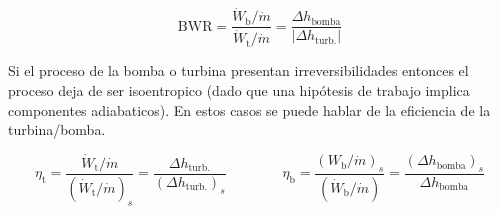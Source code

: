 \documentclass{article}
\begin{document}
\[
\mathrm{BWR}=\frac{\dot{W}_{\mathrm{b}} / \dot{m}}{\dot{W}_{\mathrm{t}} / \dot{m}}= \frac{\Delta h_{\mathrm{bomba}} }{|\Delta h_{\mathrm{turb.}}| }
\]

Si el proceso de la bomba o turbina presentan irreversibilidades entonces el proceso deja de ser isoentropico (dado que una hipótesis de trabajo implica componentes adiabaticos). En estos casos se puede hablar de la eficiencia de la turbina/bomba.

\[
\eta_{\mathrm{t}}=\frac{\dot{W}_{\mathrm{t}} / \dot{m}}{\left(\dot{W}_{\mathrm{t}} / \dot{m}\right)_{s}}= \frac{\Delta h_{\mathrm{turb.}}}{(\Delta h_{\mathrm{turb.}})_s} \qquad \qquad \eta_{\mathrm{b}}=\frac{\left(W_{\mathrm{b}} / \dot{m}\right)_{s}}{\left(\dot{W}_{\mathrm{b}} / \dot{m}\right)}=\frac{(\Delta h_{\mathrm{bomba}})_s}{\Delta h_{\mathrm{bomba}}}
\]




\end{document}
